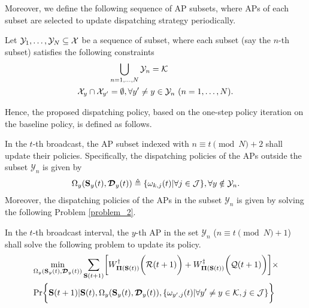 Moreover, we define the following sequence of AP subsets, where APs of each subset are selected to update dispatching strategy periodically.
\begin{definition}
    Let $\mathcal{Y}_{1}, \dots, \mathcal{Y}_{N} \subseteq \mathcal{X}$ be a sequence of subset, where each subset (say the $n$-th subset) satisfies the following constraints
    \begin{align}
        &\bigcup_{n=1,\dots,N} \mathcal{Y}_{n} = \mathcal{K}
        \\
        \mathcal{X}_{y} \cap \mathcal{X}_{y'} &=\emptyset, \forall y' \neq y \in \mathcal{Y}_{n}~(n=1,\dots,N).
    \end{align}
\end{definition}

Hence, the proposed dispatching policy, based on the one-step policy iteration on the baseline policy, is defined as follows.
\begin{definition}
    In the $t$-th broadcast, the AP subset indexed with $n \equiv t \pmod{N} + 2$ shall update their policies.
    Specifically, the dispatching policies of the APs outside the subset $\mathcal{Y}_{n}$ is given by
    \begin{align}
        \Omega_{y}( \mathbf{S}_{y}(t),\boldsymbol{\mathcal{D}}_{y}(t) ) \triangleq \{ \omega_{k,j}(t) | \forall j\in\mathcal{J} \}, \forall y\notin\mathcal{Y}_{n}.
    \end{align}
    Moreover, the dispatching policies of the APs in the subset $\mathcal{Y}_{n}$ is given by solving the following Problem \ref{problem_2}.
\end{definition}

\begin{problem}
    In the $t$-th broadcast interval, the $y$-th AP in the set $\mathcal{Y}_{n}$ ($n \equiv t \pmod{N} + 1$) shall solve the following problem to update its policy.
    \begin{align}
        &\min_{ \Omega_{y}(\Stat_{y}(t), \Delay_{y}(t)) } \sum_{\Stat(t+1)} \Bracket{
            W^{\dagger}_{\Baseline(\Stat(t))} \Paren{\mathcal{R}(t+1)} + W^{\ddagger}_{\Baseline(\Stat(t))}\Paren{\mathcal{Q}(t+1)}
        } \times
        \nonumber\\
        &\Pr\Brace{
            \Stat(t+1) | \Stat(t), \Omega_{y}(\Stat_{y}(t), \Delay_{y}(t)), \set{\omega_{y',j}(t)|\forall y' \neq y \in\apSet, j\in\jSpace}
        }
    \end{align}
    \label{problem_2}
\end{problem}

